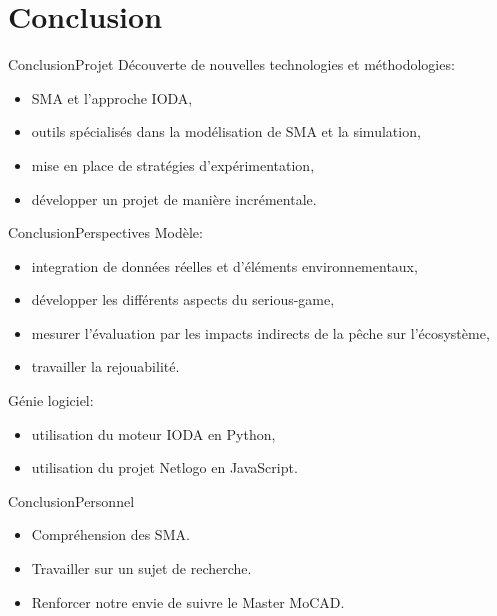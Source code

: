 \documentclass[t, 10pt]{beamer}
\begin{document}
	\section{Conclusion}
        
        \begin{frame}[c]{Conclusion}{Projet}
          Découverte de nouvelles technologies et méthodologies:
          \begin{itemize}
          \item{SMA et l'approche IODA,}
          \item{outils spécialisés dans la modélisation de SMA et la simulation,}
          \item{mise en place de stratégies d'expérimentation,}
          \item{développer un projet de manière incrémentale.}
          \end{itemize}
        \end{frame}
        
        \begin{frame}[c]{Conclusion}{Perspectives}
          Modèle:
          \begin{itemize}
          \item{integration de données réelles et d'éléments environnementaux,}
          \item{développer les différents aspects du serious-game,}
          \item{mesurer l'évaluation par les impacts indirects de la pêche sur l'écosystème,}
          \item{travailler la rejouabilité.}
          \end{itemize}
          Génie logiciel:
          \begin{itemize}
          \item{utilisation du moteur IODA en Python,}
          \item{utilisation du projet Netlogo en JavaScript.}
          \end{itemize}
          
        \end{frame}
        
        \begin{frame}[c]{Conclusion}{Personnel}
          \begin{itemize}
          \item{Compréhension des SMA.}
          \item{Travailler sur un sujet de recherche.}
          \item{Renforcer notre envie de suivre le Master MoCAD.}
          \end{itemize}
        \end{frame}
        
\end{document}
